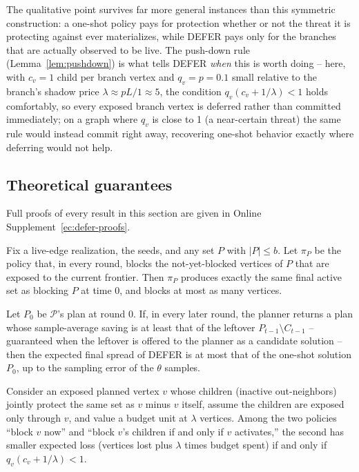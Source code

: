 \documentclass[ijoc,sglanonrev]{informs4}
\begin{document}
The qualitative point survives far more general instances than this
symmetric construction: a one-shot policy pays for protection whether or
not the threat it is protecting against ever materializes, while DEFER
pays only for the branches that are actually observed to be live. The
push-down rule (Lemma~\ref{lem:pushdown}) is what tells DEFER \emph{when}
this is worth doing -- here, with $c_v=1$ child per branch vertex and
$q_v=p=0.1$ small relative to the branch's shadow price
$\lambda\approx pL/1\approx5$, the condition $q_v(c_v+1/\lambda)<1$ holds
comfortably, so every exposed branch vertex is deferred rather than
committed immediately; on a graph where $q_v$ is close to 1 (a near-certain
threat) the same rule would instead commit right away, recovering one-shot
behavior exactly where deferring would not help.

\subsection{Theoretical guarantees}\label{sec:defer-theory}

Full proofs of every result in this section are given in
Online Supplement~\ref{ec:defer-proofs}.

\begin{lemma}\label{lem:defer-free}
Fix a live-edge realization, the seeds, and any set $P$ with $|P|\le b$. Let
$\pi_P$ be the policy that, in every round, blocks the not-yet-blocked
vertices of $P$ that are exposed to the current frontier. Then $\pi_P$
produces exactly the same final active set as blocking $P$ at time $0$, and
blocks at most as many vertices.
\end{lemma}

\begin{theorem}\label{thm:defer-dominates}
Let $P_0$ be $\mathcal P$'s plan at round $0$. If, in every later round, the
planner returns a plan whose sample-average saving is at least that of the
leftover $P_{t-1}\setminus C_{t-1}$ -- guaranteed when the leftover is
offered to the planner as a candidate solution -- then the expected final
spread of DEFER is at most that of the one-shot solution $P_0$, up to the
sampling error of the $\theta$ samples.
\end{theorem}

\begin{lemma}\label{lem:pushdown}
Consider an exposed planned vertex $v$ whose children (inactive
out-neighbors) jointly protect the same set as $v$ minus $v$ itself, assume
the children are exposed only through $v$, and value a budget unit at
$\lambda$ vertices. Among the two policies ``block $v$ now'' and ``block
$v$'s children if and only if $v$ activates,'' the second has smaller
expected loss (vertices lost plus $\lambda$ times budget spent) if and only
if $q_v(c_v+1/\lambda)<1$.
\end{lemma}
\end{document}
